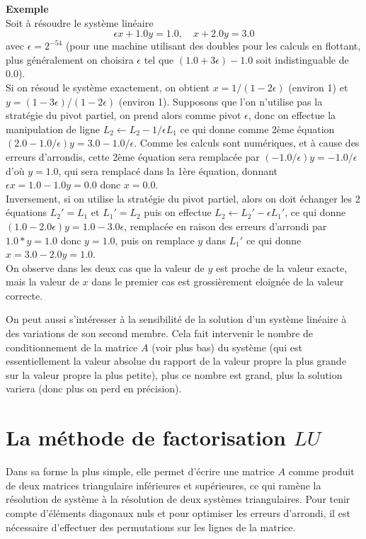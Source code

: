 \documentclass[a4paper,11pt]{book}
\begin{document}
\begin{giacjshere}
{\bf Exemple}\\
Soit \`a r\'esoudre le syst\`eme lin\'eaire
\[ \epsilon x + 1.0 y = 1.0 , \quad x + 2.0 y = 3.0 \]
avec $\epsilon =2^{-54}$ (pour une machine utilisant des doubles pour
les calculs en flottant,
plus g\'en\'eralement on choisira $\epsilon$ tel que $(1.0+3\epsilon)-1.0$
soit indistinguable de 0.0).\\
Si on r\'esoud le syst\`eme exactement,
on obtient $x=1/(1-2\epsilon)$ (environ 1)
et $y=(1-3\epsilon)/(1-2\epsilon)$ (environ 1).
Supposons que l'on n'utilise pas la strat\'egie du pivot partiel,
on prend alors comme pivot $\epsilon$, donc on effectue la
manipulation de ligne $L_2 \leftarrow L_2 - 1/\epsilon L_1$ ce qui
donne comme 2\`eme \'equation $(2.0-1.0/\epsilon)y=3.0-1.0/\epsilon$.
Comme les calculs sont num\'eriques, et \`a cause des erreurs
d'arrondis, cette 2\`eme \'equation sera remplac\'ee par
$(-1.0/\epsilon)y=-1.0/\epsilon$ d'o\`u $y=1.0$, qui sera remplac\'e
dans la 1\`ere \'equation, donnant $\epsilon x = 1.0-1.0y=0.0$ donc
$x=0.0$.\\
Inversement, si on utilise la strat\'egie du pivot partiel, alors
on doit \'echanger les 2 \'equations $L_2'=L_1$ et $L_1'=L_2$ puis on effectue
$L_2 \leftarrow L_2' - \epsilon L_1'$, ce qui donne
$(1.0-2.0\epsilon) y = 1.0 - 3.0 \epsilon $, remplac\'ee en raison
des erreurs d'arrondi par $1.0*y=1.0$ donc $y=1.0$, puis on remplace
$y$ dans $L_1'$ ce qui donne $x=3.0-2.0y=1.0$.\\
On observe dans les deux cas que la valeur de $y$ est proche de la
valeur exacte, mais la valeur de $x$ dans le premier cas est
grossi\`erement eloign\'ee de la valeur correcte.

On peut aussi s'intéresser à la sensibilité de la solution d'un
système linéaire à des variations de son second membre. Cela fait intervenir
le nombre de conditionnement de la matrice $A$ (voir plus bas) du système (qui
est essentiellement la valeur absolue du rapport de la valeur propre
la plus grande sur la valeur propre la plus petite), plus
ce nombre est grand, plus la solution variera (donc plus on
perd en précision).

\section{La méthode de factorisation $LU$} 
Dans sa forme la plus simple, elle permet d'écrire
une matrice $A$ comme produit de deux matrices triangulaire
inférieures et supérieures, ce qui ram\`ene la résolution
de système à la résolution de deux systèmes triangulaires.
Pour tenir compte d'\'el\'ements diagonaux nuls et pour optimiser 
les erreurs d'arrondi, il est n\'ecessaire d'effectuer des
permutations sur les lignes de la matrice.


\end{giacjshere}
\end{document}
